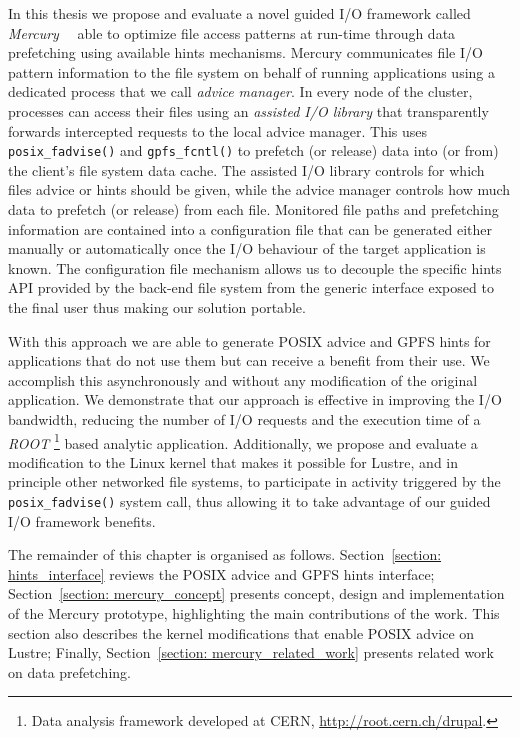 In this thesis we propose and evaluate a novel guided I/O framework called \textit{Mercury}~\cite{Congiu2014}~\cite{Congiu2017} able to optimize file access patterns at run-time through data prefetching using available hints 
mechanisms. Mercury communicates file I/O pattern information to the file system on behalf of running applications using a dedicated process that we call \textit{advice manager}. In every node of the cluster, processes can access 
their files using an \textit{assisted I/O library} that transparently forwards intercepted requests to the local advice manager. This uses \texttt{posix\_fadvise()} and \texttt{gpfs\_fcntl()} to prefetch (or release) data 
into (or from) the client's file system data cache. The assisted I/O library controls for which files advice or hints should be given, while the advice manager controls how much data to prefetch (or release) from each file. 
Monitored file paths and prefetching information are contained into a configuration file that can be generated either manually or automatically once the I/O behaviour of the target application is known. The configuration file 
mechanism allows us to decouple the specific hints API provided by the back-end file system from the generic interface exposed to the final user thus making our solution portable.

With this approach we are able to generate POSIX advice and GPFS hints for applications that do not use them but can receive a benefit from their use. We accomplish this asynchronously and without any modification of the original 
application. We demonstrate that our approach is effective in improving the I/O bandwidth, reducing the number of I/O requests and the execution time of a \textit{ROOT} \footnote{Data analysis framework developed at CERN, 
\url{http://root.cern.ch/drupal}.} based analytic application. Additionally, we propose and evaluate a modification to the Linux kernel that makes it possible for Lustre, and in principle other networked file systems, to participate 
in activity triggered by the \texttt{posix\_fadvise()} system call, thus allowing it to take advantage of our guided I/O framework benefits.

The remainder of this chapter is organised as follows. Section~\ref{section: hints_interface} reviews the POSIX advice and GPFS hints interface; Section~\ref{section: mercury_concept} presents concept, design and implementation 
of the Mercury prototype, highlighting the main contributions of the work. This section also describes the kernel modifications that enable POSIX advice on Lustre; Finally, Section~\ref{section: mercury_related_work} presents related 
work on data prefetching.

